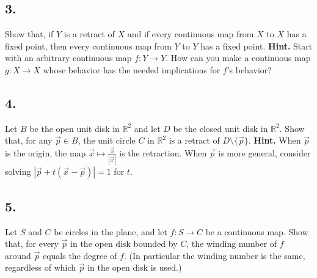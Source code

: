 \documentclass{amsart}
\theoremstyle{plain}
\theoremstyle{definition}
\theoremstyle{remark}
\begin{document}
\vspace{.15in}
\noindent
\subsection*{3.} Show that, if $Y$ is a retract of $X$ and if every continuous map from $X$ to $X$ has a fixed point, then every continuous map from $Y$ to $Y$ has a fixed point. {\bf Hint.} Start with an arbitrary continuous map $f : Y\to Y$. How can you make a continuous map $g : X\to X$ whose behavior has the needed implications for $f$'s behavior?
 


\vspace{.15in}
\noindent
\subsection*{4.} Let $B$ be the open unit disk in $\mathbb R ^2$ and let $D$ be the closed unit disk in $\mathbb R ^2$. Show that, for any $\vec{p} \in B$, the unit circle $C$ in $\mathbb R ^2$ is a retract of $D\setminus \{ \vec{p}\}$. {\bf Hint.} When $\vec{p}$ is the origin, the map $\vec{x} \mapsto \frac{\vec{x}}{|\vec{x}|}$ is the retraction. When $\vec{p}$ is more general, consider solving $|\vec{p} + t(\vec{x}-\vec{p})| = 1$ for $t$. 



\vspace{.15in}
\noindent
\subsection*{5.} Let $S$ and $C$ be circles in the plane, and let $f : S\to C$ be a continuous map. Show that, for every $\vec{p}$ in the open disk bounded by $C$, the winding number of $f$ around $\vec{p}$ equals the degree of $f$. (In particular the winding number is the same, regardless of which $\vec{p}$ in the open disk is used.) 
 
\end{document}
